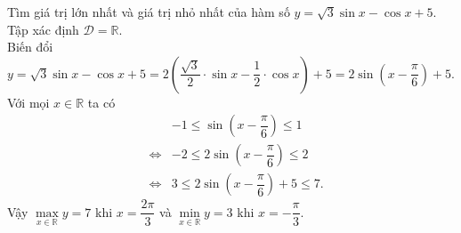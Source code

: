 \begin{ex}%
	Tìm giá trị lớn nhất và giá trị nhỏ nhất của hàm số $y=\sqrt{3} \sin x-\cos x+5$.
	\loigiai
	{
		Tập xác định $\mathscr{D}=\mathbb{R}$.\\
		Biến đổi $y=\sqrt{3} \sin x-\cos x+5=2\left(\dfrac{\sqrt{3}}{2}\cdot\sin x-\dfrac{1}{2}\cdot\cos x\right)+5=2\sin\left(x-\dfrac{\pi}{6}\right)+5$.\\
		Với mọi $x\in \mathbb{R}$ ta có
		\allowdisplaybreaks
		\begin{eqnarray*}
			& & -1\leq \sin\left(x-\dfrac{\pi}{6}\right)\leq 1\\
			&\Leftrightarrow& -2\leq 2\sin\left(x-\dfrac{\pi}{6}\right)\leq 2\\
			&\Leftrightarrow&3\leq  2\sin\left(x-\dfrac{\pi}{6}\right)+5\leq 7.
		\end{eqnarray*}
		Vậy $\max\limits_{x \in \mathbb{R}} y=7$ khi $x=\dfrac{2\pi}{3}$ và $\min\limits_{x \in \mathbb{R}} y=3$ khi $x=-\dfrac{\pi}{3}$.
	}
\end{ex}
